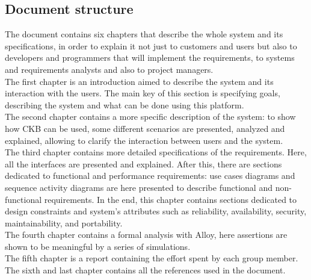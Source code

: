 \subsection{Document structure}
The document contains six chapters that describe the whole system and its specifications, in order to explain it not just to customers and users but also to developers and programmers that will implement the requirements, to systems and requirements analysts and also to project managers. \\
The first chapter is an introduction aimed to describe the system and its interaction with the users. The main key of this section is specifying goals, describing the system and what can be done using this platform. \\
The second chapter contains a more specific description of the system: to show how CKB can be used, some different scenarios are presented, analyzed and explained, allowing to clarify the interaction between users and the system. \\
The third chapter contains more detailed specifications of the requirements. Here, all the interfaces are presented and explained. After this, there are sections dedicated to functional and performance requirements: use cases diagrams and sequence activity diagrams are here presented to describe functional and non-functional requirements. In the end, this chapter contains sections dedicated to design constraints and system’s attributes such as reliability, availability, security, maintainability, and portability. \\
The fourth chapter contains a formal analysis with Alloy, here assertions are shown to be meaningful by a series of simulations. \\
The fifth chapter is a report containing the effort spent by each group member. \\
The sixth and last chapter contains all the references used in the document.